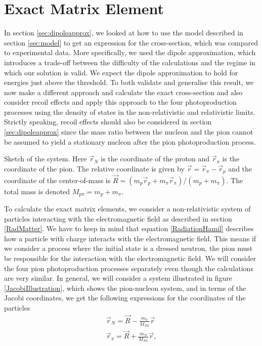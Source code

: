 \section{Exact Matrix Element}\label{sec:exact}
In section \ref{sec:dipoleapprox}, we looked at how to use the model described in section \ref{sec:model} to get an expression for the cross-section, which was compared to experimental data. More specifically, we used the dipole approximation, which introduces a trade-off between the difficulty of the calculations and the regime in which our solution is valid. We expect the dipole approximation to hold for energies just above the threshold. To both validate and generalise this result, we now make a different approach and calculate the exact cross-section and also consider recoil effects and apply this approach to the four photoproduction processes using the density of states in the non-relativistic and relativistic limits. Strictly speaking, recoil effects should also be considered in section \ref{sec:dipoleapprox} since the mass ratio between the nucleon and the pion cannot be assumed to yield a stationary nucleon after the pion photoproduction process.  
\begin{marginfigure}
	\centering
	
	\caption{Sketch of the system. Here $\vec{r}_N$ is the coordinate of the proton and $\vec{r}_\pi$ is the coordinate of the pion. The relative coordinate is given by $\vec{r}=\vec{r}_\pi-\vec{r}_p$ and the coordinate of the center-of-mass is $\vec{R}=(m_p \vec{r}_p+m_\pi\vec{r}_\pi)/(m_p+m_\pi)$. The total mass is denoted $M_{p\pi}=m_p+m_\pi$.}
	\label{JacobiIllustration}
\end{marginfigure}
To calculate the exact matrix elements, we consider a non-relativistic system of particles interacting with the electromagnetic field as described in section \ref{RadMatter}. We have to keep in mind that equation \eqref{RadiationHamil} describes how a particle with charge interacts with the electromagnetic field. This means if we consider a process where the initial state is a dressed neutron, the pion must be responsible for the interaction with the electromagnetic field. We will consider the four pion photoproduction processes separately even though the calculations are very similar. In general, we will consider a system illustrated in figure \ref{JacobiIllustration}, which shows the pion-nucleon system, and in terms of the Jacobi coordinates, we get the following expressions for the coordinates of the particles
\begin{align} \label{Coordinates}
	\vec{r}_N = \vec{R}-\frac{m_\pi}{M_{N\pi}}\vec{r} \\
	\vec{r}_\pi = \vec{R}+\frac{m_N}{M_{N\pi}}\vec{r},
\end{align}
